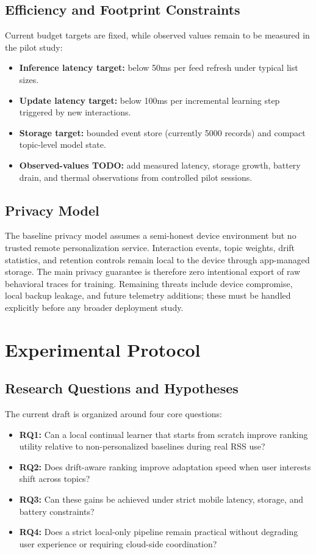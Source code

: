 \documentclass[11pt]{article}
\begin{document}
\subsection{Efficiency and Footprint Constraints}
Current budget targets are fixed, while observed values remain to be measured in the pilot study:
\begin{itemize}[leftmargin=*]
\item \textbf{Inference latency target:} below 50ms per feed refresh under typical list sizes.
\item \textbf{Update latency target:} below 100ms per incremental learning step triggered by new interactions.
\item \textbf{Storage target:} bounded event store (currently 5000 records) and compact topic-level model state.
\item \textbf{Observed-values TODO:} add measured latency, storage growth, battery drain, and thermal observations from controlled pilot sessions.
\end{itemize}

\subsection{Privacy Model}
The baseline privacy model assumes a semi-honest device environment but no trusted remote personalization service. Interaction events, topic weights, drift statistics, and retention controls remain local to the device through app-managed storage. The main privacy guarantee is therefore zero intentional export of raw behavioral traces for training. Remaining threats include device compromise, local backup leakage, and future telemetry additions; these must be handled explicitly before any broader deployment study.

\section{Experimental Protocol}
\subsection{Research Questions and Hypotheses}
The current draft is organized around four core questions:

\begin{itemize}[leftmargin=*]
\item \textbf{RQ1:} Can a local continual learner that starts from scratch improve ranking utility relative to non-personalized baselines during real RSS use?
\item \textbf{RQ2:} Does drift-aware ranking improve adaptation speed when user interests shift across topics?
\item \textbf{RQ3:} Can these gains be achieved under strict mobile latency, storage, and battery constraints?
\item \textbf{RQ4:} Does a strict local-only pipeline remain practical without degrading user experience or requiring cloud-side coordination?
\end{itemize}
\end{document}
